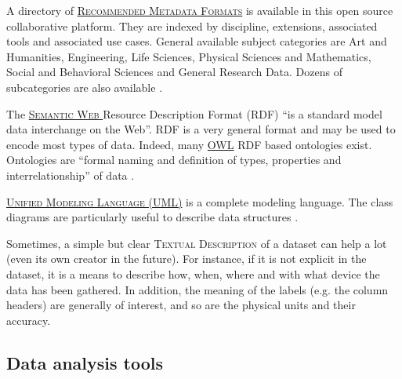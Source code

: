 \noindent A directory of   \textsc{\href{http://rd-alliance.github.io/metadata-directory/}{Recommended Metadata Formats}} is available in this open source collaborative platform. They are indexed by discipline, extensions, associated tools and associated use cases. General available subject categories are Art and Humanities, Engineering, Life Sciences, Physical Sciences and Mathematics, Social and Behavioral Sciences and General Research Data. Dozens of subcategories are also available \cite{metadatadirectory_metadata_2015}.

\vspace{0.4cm}

\noindent The  \textsc{\href{http://www.w3.org/RDF/}{Semantic Web }} Resource Description Format (RDF) ``is a standard model data interchange on the Web''\cite{w3c_rdf_2014}. RDF is a very general format and may be used to encode most types of data. Indeed, many \href{http://www.w3.org/2001/sw/wiki/OWL}{OWL} \cite{w3c_owl_2009} RDF based ontologies exist. Ontologies are ``formal naming and definition of types, properties and interrelationship'' of data \cite{wikipedia_ontology_2015}.

\vspace{0.4cm}

 \textsc{\href{http://www.uml.org/}{Unified Modeling Language (UML)}} is a complete modeling language. The class diagrams are particularly useful to describe data structures \cite{uml.org_unified_2015}.

\vspace{0.4cm}

\noindent Sometimes, a simple but clear  \textsc{Textual Description} of a dataset can help a lot (even its own creator in the future). For instance, if it is not explicit in the dataset, it is a means to describe how, when, where and with what device the data has been gathered. In addition, the meaning of the labels (e.g. the column headers) are generally of interest, and so are the physical units and their accuracy.

\subsection{Data analysis tools}

\label{daanto}

